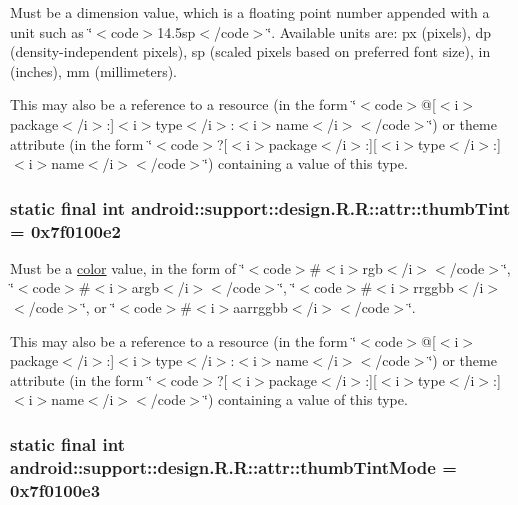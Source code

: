 Must be a dimension value, which is a floating point number appended with a unit such as \char`\"{}$<$code$>$14.5sp$<$/code$>$\char`\"{}. Available units are: px (pixels), dp (density-independent pixels), sp (scaled pixels based on preferred font size), in (inches), mm (millimeters). 

This may also be a reference to a resource (in the form \char`\"{}$<$code$>$@\mbox{[}$<$i$>$package$<$/i$>$:\mbox{]}$<$i$>$type$<$/i$>$:$<$i$>$name$<$/i$>$$<$/code$>$\char`\"{}) or theme attribute (in the form \char`\"{}$<$code$>$?\mbox{[}$<$i$>$package$<$/i$>$:\mbox{]}\mbox{[}$<$i$>$type$<$/i$>$:\mbox{]}$<$i$>$name$<$/i$>$$<$/code$>$\char`\"{}) containing a value of this type. \hypertarget{classandroid_1_1support_1_1design_1_1_r_1_1attr_902e7b10a5f8d766620ec5847f87d660}{
\subsubsection[{thumbTint}]{\setlength{\rightskip}{0pt plus 5cm}static final int android::support::design.R.R::attr::thumbTint = 0x7f0100e2}}
\label{classandroid_1_1support_1_1design_1_1_r_1_1attr_902e7b10a5f8d766620ec5847f87d660}


Must be a \hyperlink{classandroid_1_1support_1_1design_1_1_r_1_1color}{color} value, in the form of \char`\"{}$<$code$>$\#$<$i$>$rgb$<$/i$>$$<$/code$>$\char`\"{}, \char`\"{}$<$code$>$\#$<$i$>$argb$<$/i$>$$<$/code$>$\char`\"{}, \char`\"{}$<$code$>$\#$<$i$>$rrggbb$<$/i$>$$<$/code$>$\char`\"{}, or \char`\"{}$<$code$>$\#$<$i$>$aarrggbb$<$/i$>$$<$/code$>$\char`\"{}. 

This may also be a reference to a resource (in the form \char`\"{}$<$code$>$@\mbox{[}$<$i$>$package$<$/i$>$:\mbox{]}$<$i$>$type$<$/i$>$:$<$i$>$name$<$/i$>$$<$/code$>$\char`\"{}) or theme attribute (in the form \char`\"{}$<$code$>$?\mbox{[}$<$i$>$package$<$/i$>$:\mbox{]}\mbox{[}$<$i$>$type$<$/i$>$:\mbox{]}$<$i$>$name$<$/i$>$$<$/code$>$\char`\"{}) containing a value of this type. \hypertarget{classandroid_1_1support_1_1design_1_1_r_1_1attr_49ad3a9a9ccd448c862fe1addcd189ac}{
\subsubsection[{thumbTintMode}]{\setlength{\rightskip}{0pt plus 5cm}static final int android::support::design.R.R::attr::thumbTintMode = 0x7f0100e3}}
\label{classandroid_1_1support_1_1design_1_1_r_1_1attr_49ad3a9a9ccd448c862fe1addcd189ac}



